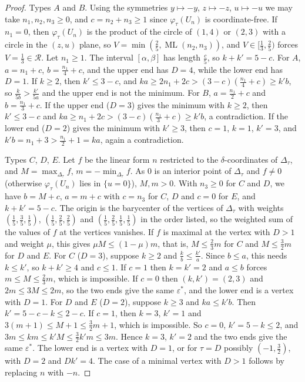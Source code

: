 \documentclass[12pt]{amsart}
\theoremstyle{definition}\newtheorem{definition}[theorem]{Definition}
\theoremstyle{remark}\newtheorem{remark}[theorem]{Remark}
\newcommand{\ML}{\operatorname{ML}}
\begin{document}
\begin{proof}
Types $A$ and $B$. Using the symmetries $y\mapsto-y$, $z\mapsto-z$, $u\mapsto-u$ we may take $n_1,n_2,n_3\ge0$, and $c=n_2+n_3\ge1$ since $\varphi_\tau(U_n)$ is coordinate-free. If $n_1=0$, then $\varphi_\tau(U_n)$ is the product of the circle of $(1,4)$ or $(2,3)$ with a circle in the $(z,u)$ plane, so $V=\min(\frac25,\ML(n_2,n_3))$, and $V\in[\frac13,\frac25)$ forces $V=\frac13\in\mathcal R$. Let $n_1\ge1$. The interval $[\alpha,\beta]$ has length $\frac c5$, so $k+k'=5-c$. For $A$, $a=n_1+c$, $b=\frac{n_1}4+c$, and the upper end has $D=4$, while the lower end has $D=1$. If $k\ge2$, then $k'\le3-c$, and $k a\ge 2n_1+2c>(3-c)(\frac{n_1}4+c)\ge k'b$, so $\frac k{5b}>\frac{k'}{5a}$ and the upper end is not the minimum. For $B$, $a=\frac{n_1}2+c$ and $b=\frac{n_1}3+c$. If the upper end ($D=3$) gives the minimum with $k\ge2$, then $k'\le3-c$ and $ka\ge n_1+2c>(3-c)(\frac{n_1}3+c)\ge k'b$, a contradiction. If the lower end ($D=2$) gives the minimum with $k'\ge3$, then $c=1$, $k=1$, $k'=3$, and $k'b=n_1+3>\frac{n_1}2+1=ka$, again a contradiction.

Types $C$, $D$, $E$. Let $f$ be the linear form $n$ restricted to the $\delta$-coordinates of $\Delta_\tau$, and $M=\max_{\Delta_\tau}f$, $m=-\min_{\Delta_\tau}f$. As $0$ is an interior point of $\Delta_\tau$ and $f\ne0$ (otherwise $\varphi_\tau(U_n)$ lies in $\{u=0\}$), $M,m>0$. With $n_3\ge0$ for $C$ and $D$, we have $b=M+c$, $a=m+c$ with $c=n_3$ for $C$, $D$ and $c=0$ for $E$, and $k+k'=5-c$. The origin is the barycenter of the vertices of $\Delta_\tau$ with weights $(\frac15,\frac35,\frac15)$, $(\frac15,\frac25,\frac25)$ and $(\frac15,\frac25,\frac15,\frac15)$ in the order listed, so the weighted sum of the values of $f$ at the vertices vanishes. If $f$ is maximal at the vertex with $D>1$ and weight $\mu$, this gives $\mu M\le(1-\mu)m$, that is, $M\le\frac23m$ for $C$ and $M\le\frac32m$ for $D$ and $E$. For $C$ ($D=3$), suppose $k\ge2$ and $\frac kb\le\frac{k'}a$. Since $b\le a$, this needs $k\le k'$, so $k+k'\ge4$ and $c\le1$. If $c=1$ then $k=k'=2$ and $a\le b$ forces $m\le M\le\frac23m$, which is impossible. If $c=0$ then $(k,k')=(2,3)$ and $2m\le 3M\le2m$, so the two ends give the same $\varepsilon^*$, and the lower end is a vertex with $D=1$. For $D$ and $E$ ($D=2$), suppose $k\ge3$ and $k a\le k'b$. Then $k'=5-c-k\le2-c$. If $c=1$, then $k=3$, $k'=1$ and $3(m+1)\le M+1\le\frac32m+1$, which is impossible. So $c=0$, $k'=5-k\le2$, and $3m\le km\le k'M\le\frac32k'm\le3m$. Hence $k=3$, $k'=2$ and the two ends give the same $\varepsilon^*$. The lower end is a vertex with $D=1$, or for $\tau=D$ possibly $(-1,\frac32)$, with $D=2$ and $Dk'=4$. The case of a minimal vertex with $D>1$ follows by replacing $n$ with $-n$.
\end{proof}
\end{document}
